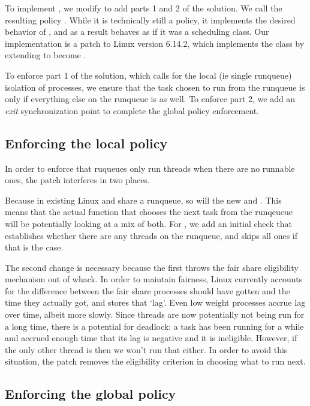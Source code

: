 To implement \beclass{}, we modify \schedidle{} to add parts 1 and 2 of the
solution. We call the resulting policy \schedbe{}. While it is technically still
a policy, it implements the desired behavior of \beclass{}, and as a result
behaves as if it was a scheduling class. Our implementation is a patch to Linux
version 6.14.2, which implements the \beclass{} class by extending \schedidle{}
to become \schedbe{}.

To enforce part 1 of the solution, which calls for the local (ie single
runqueue) isolation of \schedbe{} processes, we ensure that the task chosen to
run from the runqueue is only \schedbe{} if everything else on the runqueue is
as well. To enforce part 2, we add an \textit{exit} synchronization point to
complete the global policy enforcement.

\subsection{Enforcing the local policy}

In order to enforce that ruqueues only run \schedbe{} threads when there are no
runnable \schednormal{} ones, the patch interferes in two places. 

Because in existing Linux \schedidle{} and \schednormal{} share a runqueue, so
will the new \schedbe{} and \schednormal{}. This means that the actual function
that chooses the next task from the runqeueue will be potentially looking at a
mix of both. For \schedbe{}, we add an initial check that establishes whether
there are any \schednormal{} threads on the runqueue, and skips all \schedbe{}
ones if that is the case. 

The second change is necessary because the first throws the fair share
eligibility mechanism out of whack. In order to maintain fairness, Linux
currently accounts for the difference between the fair share processes should
have gotten and the time they actually got, and stores that `lag'. Even low
weight processes accrue lag over time, albeit more slowly. Since \schedbe{}
threads are now potentially not being run for a long time, there is a potential
for deadlock: a \schednormal{} task has been running for a while and accrued
enough time that its lag is negative and it is ineligible. However, if the only
other thread is \schedbe{} then we won't run that either. In order to avoid this
situation, the patch removes the eligibility criterion in choosing what to run
next.


\subsection{Enforcing the global policy}

